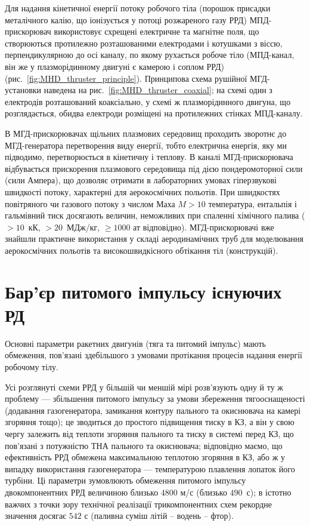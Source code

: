 Для надання кінетичної енергії потоку робочого тіла (порошок присадки металічного калію, що іонізується у потоці розжареного газу РРД) МПД-прискорювач використовує схрещені електричне та магнітне поля, що створюються протилежно розташованими електродами і котушками з віссю, перпендикулярною до осі каналу, по якому рухається робоче тіло (МПД-канал, він же у плазморідинному двигуні є камерою і соплом РРД) (рис.~\ref{fig:MHD_thruster_principle}). Принципова схема рушійної МГД-установки наведена на рис.~\ref{fig:MHD_thruster_coaxial}; на схемі один з електродів розташований коаксіально, у схемі ж плазморідинного двигуна, що розглядається, обидва електроди розміщені на протилежних стінках МПД-каналу.

В МГД-прискорювачах щільних плазмових середовищ проходить зворотнє до МГД-генератора перетворення виду енергії, тобто електрична енергія, яку ми підводимо, перетворюється в кінетичну і теплову. В каналі МГД-прискорювача відбувається прискорення плазмового середовища під дією пондеромоторної сили (сили Ампера), що дозволяє отримати в лабораторних умовах гіперзвукові швидкості потоку, характерні для аерокосмічних польотів. При швидкостях повітряного чи газового потоку з числом Маха $M > 10$ температура, ентальпія і гальмівний тиск досягають величин, неможливих при спаленні хімічного палива ($> 10$~кК, $>20$~МДж/кг, $\ge 1000$ ат відповідно). МГД-прискорювачі вже знайшли практичне використання у складі аеродинамічних труб для моделювання аерокосмічних польотів та високошвидкісного обтікання тіл (конструкцій).~\cite[с. 10]{Panchenko}

\section{Бар'єр питомого імпульсу існуючих РД}

Основні параметри ракетних двигунів (тяга та питомий імпульс) мають обмеження, пов'язані здебільшого з умовами протікання процесів надання енергії робочому тілу.

Усі розглянуті схеми РРД у більшій чи меншій мірі розв'язують одну й ту ж проблему --- збільшення питомого імпульсу за умови збереження тягооснащеності (додавання газогенератора, замикання контуру пального та окиснювача на камері згоряння тощо); це зводиться до простого підвищення тиску в КЗ, а він у свою чергу залежить від теплоти згоряння пального та тиску в системі перед КЗ, що пов'язані з потужністю ТНА пального та окиснювача; відповідно маємо, що ефективність РРД обмежена максимальною теплотою згоряння в КЗ, або ж у випадку використання газогенератора --- температурою плавлення лопаток його турбіни. Ці параметри зумовлюють обмеження питомого імпульсу двокомпонентних РРД величиною близько $4800$ м/с (близько $490$~с); в істотно важчих з точки зору технічної реалізації трикомпонентних схем рекордне значення досягає $542$ с (паливна суміш літій -- водень -- фтор). 


